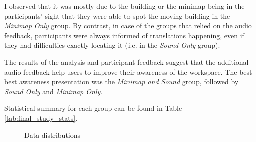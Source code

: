 I observed that it was mostly due to the building or the minimap being in the participants' sight that they were able to spot the moving building in the \textit{Minimap Only} group. By contrast, in case of the groups that relied on the audio feedback, participants were always informed of translations happening, even if they had difficulties exactly locating it (i.e. in the \textit{Sound Only} group).



The results of the analysis and participant-feedback suggest that the additional audio feedback help users to improve their awareness of the workspace. The best best awareness presentation was the \textit{Minimap and Sound} group, followed by \textit{Sound Only} and \textit{Minimap Only}.

Statistical summary for each group can be found in Table \ref{tab:final_study_stats}.

\begin{figure}
	\centering
	
	

	
	
	\par \smallskip
	
	\caption{Data distributions}
	\label{fig:histograms}
\end{figure}

